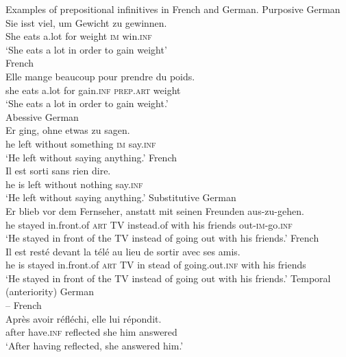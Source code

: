 \documentclass[output=paper]{langscibook}
\begin{document}
\ea Examples of prepositional infinitives in French and German.\label{tab:kalm:1}
\ea Purposive 
\ea German\\
   \gll Sie   isst   viel,   um   Gewicht   zu   gewinnen.\\
        She  eats  a.lot   for   weight     \textsc{im}   win.\textsc{inf}\\
   \glt ‘She eats a lot in order to gain weight’\\
\ex French\\
    \gll Elle   mange   beaucoup pour   prendre   du   poids.\\
    she   eats   a.lot for   gain.\textsc{inf}   \textsc{prep.art}   weight \\
\glt ‘She eats a lot in order to gain weight.’\\
\z
\ex Abessive 
\ea German\\
\gll Er   ging,   ohne     etwas     zu   sagen.\\
     he   left   without   something   \textsc{im}   say.\textsc{inf}\\
\glt ‘He left without saying anything.’
\ex French\\
\gll Il   est   sorti   sans     rien     dire.\\
     he   is   left   without   nothing   say.\textsc{inf}\\
\glt ‘He left without saying anything.’
\z
\ex Substitutive
\ea German\\
\gll Er   blieb   vor     dem   Fernseher,   anstatt mit   seinen   Freunden   aus-zu-gehen.\\
     he   stayed   in.front.of   \textsc{art}   TV     instead.of with   his   friends   out-\textsc{im}{}-go.\textsc{inf}\\
\glt ‘He stayed in front of the TV instead of going out with his friends.’
\ex French\\
\gll Il   est   resté   devant     la   télé au   lieu   de   sortir     avec   ses   amis.\\
     he   is   stayed   in.front.of   \textsc{art}   TV in   stead   of   going.out.\textsc{inf}    with   his   friends\\
\glt ‘He stayed in front of the TV instead of going out with his friends.’
\z
\ex Temporal (anteriority)
\ea German\\
    –
\ex French\\
\gll Après   avoir     réfléchi,   elle   lui   répondit.\\
after   have.\textsc{inf}   reflected   she   him   answered\\
\glt ‘After having reflected, she answered him.’\\
\z
\z
\z
\end{document}
